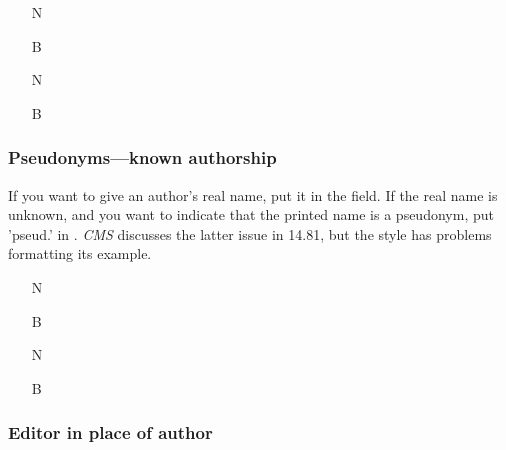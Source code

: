 \documentclass[11pt,letterpaper,oneside]{article}
\begin{document}
\begin{itemize}
\item[N] 

\item[B] 

\item[N] 

\item[B] 
\end{itemize}





\setcounter{subsubsection}{81}
\subsubsection{Pseudonyms---known authorship}
\label{14.82}

If you want to give an author's real name, put it in the
 field. If the real name is unknown, and you want
to indicate that the printed name is a pseudonym, put 'pseud.' in
. \textit{CMS} discusses the latter issue in
14.81, but the style has problems formatting its example.

\begin{itemize}
\item[N] 

\item[B] 

\item[N] 

\item[B] 
\end{itemize}

\setcounter{subsubsection}{86}
\subsubsection{Editor in place of author}
\label{14.87}
\end{document}
